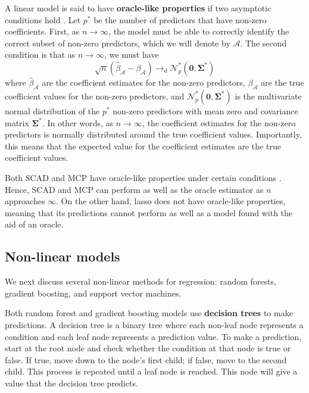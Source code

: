 \documentclass{article}
\begin{document}
A linear model is said to have \textbf{oracle-like properties} if two asymptotic conditions hold \cite{zou2006adaptive}. Let $p^\ast$ be the number of predictors that have non-zero coefficients. First, as $n\to \infty$, the model must be able to correctly identify the correct subset of non-zero predictors, which we will denote by $\mathcal{A}$. The second condition is that as $n\to\infty$, we must have
\begin{equation}
	\sqrt{n}(\hat{\beta}_\mathcal{A} - \beta_\mathcal{A})\to_d \mathcal{N}_p^{\ast}(\mathbf{0}, \mathbf{\Sigma}^\ast)
\end{equation}
where $\hat{\beta}_\mathcal{A}$ are the coefficient estimates for the non-zero predictors, $\beta_\mathcal{A}$ are the true coefficient values for the non-zero predictors, and $\mathcal{N}_p^\ast(\mathbf{0}, \mathbf{\Sigma}^\ast)$ is the multivariate normal distribution of the $p^\ast$ non-zero predictors with mean zero and covariance matrix $\mathbf{\Sigma}^\ast$. In other words, as $n\to\infty$, the coefficient estimates for the non-zero predictors is normally distributed around the true coefficient values. Importantly, this means that the expected value for the coefficient estimates are the true coefficient values.

Both SCAD and MCP have oracle-like properties under certain conditions \cite{fan2001variable, zhang2010nearly}. Hence, SCAD and MCP can perform as well as the oracle estimator as $n$ approaches $\infty$. On the other hand, lasso does not have oracle-like properties, meaning that its predictions cannot perform as well as a model found with the aid of an oracle.

\subsection{Non-linear models}
We next discuss several non-linear methods for regression: random forests, gradient boosting, and support vector machines.

Both random forest and gradient boosting models use \textbf{decision trees} to make predictions. A decision tree is a binary tree where each non-leaf node represents a condition and each leaf node represents a prediction value. To make a prediction, start at the root node and check whether the condition at that node is true or false. If true, move down to the node's first child; if false, move to the second child. This process is repeated until a leaf node is reached. This node will give a value that the decision tree predicts.
\end{document}
